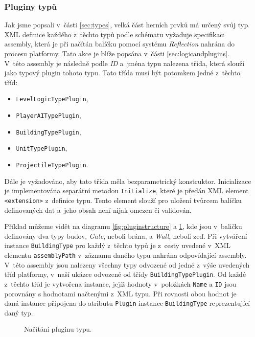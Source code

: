 \subsubsection{Pluginy typů}
\label{sec:typeplugins}
Jak jsme popsali v~části \ref{sec:types}, velká část herních prvků má určený svůj typ. XML definice každého z~těchto typů podle schématu vyžaduje specifikaci assembly, která je při načítán balíčku pomocí systému \textit{Reflection} nahrána do procesu platformy. Tato akce je blíže popsána v~části \ref{sec:logicandplugins}. V~této assembly je následně podle \textit{ID} a~jména typu nalezena třída, která slouží jako typový plugin tohoto typu. Tato třída musí být potomkem jedné z~těchto tříd:
\begin{itemize}
	\item \texttt{LevelLogicTypePlugin},
	\item \texttt{PlayerAITypePlugin},
	\item \texttt{BuildingTypePlugin},
	\item \texttt{UnitTypePlugin},
	\item \texttt{ProjectileTypePlugin}.
\end{itemize}

Dále je vyžadováno, aby tato třída měla bezparametrický konstruktor. Inicializace je implementována separátní metodou \texttt{Initialize}, které je předán XML element \texttt{<extension>} z~definice typu. Tento element slouží pro uložení tvůrcem balíčku definovaných dat a~jeho obsah není nijak omezen či validován.

Příklad můžeme vidět na diagramu \ref{fig:pluginstructure} a \ref{fig:typeplugincreation}, kde jsou v~baličku definovány dva typy budov, \textit{Gate}, neboli brána, a \textit{Wall}, neboli zeď. Při vytváření instance \texttt{BuildingType} pro každý z~těchto typů je z~cesty uvedené v~XML elementu \texttt{assemblyPath} v~záznamu daného typu nahrána odpovídající assembly. V~této assembly jsou nalezeny všechny typy odvozené od jedné z~výše uvedených tříd platformy, v~naší ukázce odvozené od třídy \texttt{BuildingTypePlugin}. Od každé z~těchto tříd je vytvořena instance, jejíž hodnoty v~položkách \texttt{Name} a \texttt{ID} jsou porovnány s hodnotami načtenými z~XML typu. Při rovnosti obou hodnot je daná instance připojena do atributu \texttt{Plugin} instance \texttt{BuildingType} reprezentující daný typ.

\begin{figure}[h]
	\centering
	\fontsize{8pt}{11pt}\selectfont
	\def\svgwidth{\textwidth}
	
	\caption{Načítání pluginu typu.}
	\label{fig:typeplugincreation}
\end{figure}

